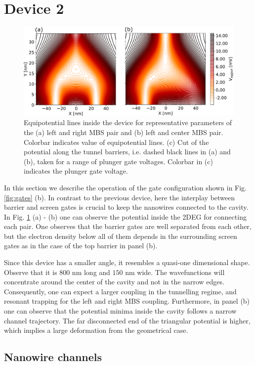 \section{Device 2}

\begin{figure}
\centering
  \includegraphics[width=0.7\linewidth]{figures/device_2_potential.pdf}
  \caption{Equipotential lines inside the device for representative parameters of the (a) left and right MBS pair and (b) left and center MBS pair. Colorbar indicates value of equipotential lines. (c) Cut of the potential along the tunnel barriers, i.e. dashed black lines in (a) and (b), taken for a range of plunger gate voltages. Colorbar in (c) indicates the plunger gate voltage.}
  \label{fig:device_2_barriers}
\end{figure}

In this section we describe the operation of the gate configuration shown in Fig. \ref{fig:gates} (b).
In contrast to the previous device, here the interplay between barrier and screen gates is crucial to keep the nanowires connected to the cavity.
In Fig.  \ref{fig:device_2_barriers} (a) - (b) one can observe the potential inside the 2DEG for connecting each pair.
One observes that the barrier gates are well separated from each other, but the electron density below all of them depends in the surrounding screen gates as in the case of the top barrier in panel (b).

Since this device has a smaller angle, it resembles a quasi-one dimensional shape.
Observe that it is $800$ nm long and $150$ nm wide.
The wavefunctions will concentrate around the center of the cavity and not in the narrow edges.
Consequently, one can expect a larger coupling in the tunnelling regime, and resonant trapping for the left and right MBS coupling.
Furthermore, in panel (b) one can observe that the potential minima inside the cavity follows a narrow channel trajectory.
The far disconnected end of the triangular potential is higher, which implies a large deformation from the geometrical case.

\subsection{Nanowire channels}

